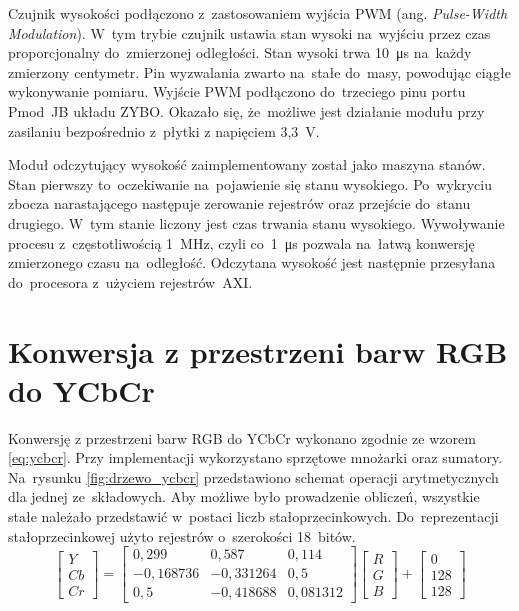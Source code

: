 Czujnik wysokości podłączono z~zastosowaniem wyjścia PWM (ang. \textit{Pulse-Width Modulation}). %
W~tym trybie czujnik ustawia stan wysoki na~wyjściu przez czas proporcjonalny do~zmierzonej odległości. 
Stan wysoki trwa 10~\si{\micro\second} na~każdy zmierzony centymetr. 
Pin wyzwalania zwarto na~stałe do~masy, powodując ciągłe wykonywanie pomiaru. 
Wyjście PWM podłączono do~trzeciego pinu portu Pmod~JB układu ZYBO. %
Okazało się, że~możliwe jest działanie modułu przy zasilaniu bezpośrednio z~płytki z napięciem 3,3~V.

Moduł odczytujący wysokość zaimplementowany został jako maszyna stanów. 
Stan pierwszy to~oczekiwanie na~pojawienie się stanu wysokiego. 
Po~wykryciu zbocza narastającego następuje zerowanie rejestrów oraz przejście do~stanu drugiego. 
W~tym stanie liczony jest czas trwania stanu wysokiego. 
Wywoływanie procesu z~częstotliwością 1~MHz, czyli co~1~\si{\micro\second} pozwala na~łatwą konwersję zmierzonego czasu na~odległość. 
Odczytana wysokość jest następnie przesyłana do~procesora z~użyciem rejestrów~AXI.


\section{Konwersja z przestrzeni barw RGB do YCbCr}
\label{subsec:konwersja}
Konwersję z przestrzeni barw RGB do YCbCr wykonano zgodnie ze wzorem \ref{eq:ycbcr}. 
Przy implementacji wykorzystano sprzętowe mnożarki oraz sumatory. 
Na~rysunku \ref{fig:drzewo_ycbcr} przedstawiono schemat operacji arytmetycznych dla jednej ze~składowych. 
Aby możliwe było prowadzenie obliczeń, wszystkie stałe należało przedstawić w~postaci liczb stałoprzecinkowych. 
Do~reprezentacji stałoprzecinkowej użyto rejestrów o~szerokości 18~bitów.
\begin{equation}
\label{eq:ycbcr}
\begin{bmatrix} Y \\ 
Cb\\
Cr
\end{bmatrix}=
\begin{bmatrix} 0,299 & 0,587 & 0,114\\ 
-0,168736 & -0,331264 & 0,5\\
0,5 & -0,418688 & 0,081312
\end{bmatrix}
\begin{bmatrix} R\\
G\\
B
\end{bmatrix}+
\begin{bmatrix} 0\\
128\\
128
\end{bmatrix}
\end{equation}


